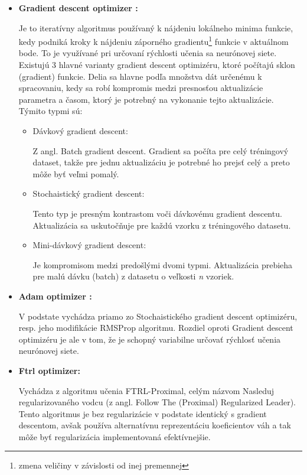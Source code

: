 \begin{itemize}
	\item \textbf{Gradient descent optimizer \cite{gradient_descent}:}
	
	Je to iteratívny algoritmus používaný k nájdeniu lokálneho minima funkcie, kedy podniká kroky k nájdeniu záporného gradientu\footnote{ zmena veličiny v závislosti od inej premennej} funkcie v aktuálnom bode. To je využívané pri určovaní rýchlosti učenia sa neurónovej siete. Existujú 3 hlavné varianty gradient descent optimizéru, ktoré počítajú sklon (gradient) funkcie. Delia sa hlavne podľa množstva dát určenému k spracovaniu, kedy sa robí kompromis medzi presnosťou aktualizácie parametra a časom, ktorý je potrebný na vykonanie tejto aktualizácie. Týmito typmi sú:
	\begin{itemize}
		\item{Dávkový gradient descent:}
		
		Z angl. Batch gradient descent. Gradient sa počíta pre celý tréningový dataset, takže pre jednu aktualizáciu je potrebné ho prejsť celý a preto môže byť veľmi pomalý. 
		\item {Stochaistický gradient descent:}
		
		Tento typ je presným kontrastom voči dávkovému gradient descentu. Aktualizácia sa uskutočňuje pre každú vzorku z tréningového datasetu. 
		\item{Mini-dávkový gradient descent:}
		
		Je kompromisom medzi predošlými dvomi typmi. Aktualizácia prebieha pre malú dávku (batch) z datasetu o veľkosti \textit{n} vzoriek.
	\end{itemize} 
	\item \textbf{Adam optimizer \cite{adam}:}
	
	V podstate vychádza priamo zo Stochaistického gradient descent optimizéru, resp. jeho modifikácie RMSProp algoritmu\cite{rms}. Rozdiel oproti Gradient descent optimizéru je ale v tom, že je schopný variabilne určovať rýchlosť učenia neurónovej siete.
	
	\item \textbf{Ftrl optimizer:}
	
	Vychádza z algoritmu učenia FTRL-Proximal\cite{ftrl}, celým názvom Nasleduj regularizovaného vodcu (z angl. Follow The (Proximal) Regularized Leader). Tento algoritmus je bez regularizácie v podstate identický s gradient descentom, avšak používa alternatívnu reprezentáciu koeficientov váh a tak môže byť regularizácia implementovaná efektívnejšie.
\end{itemize}

